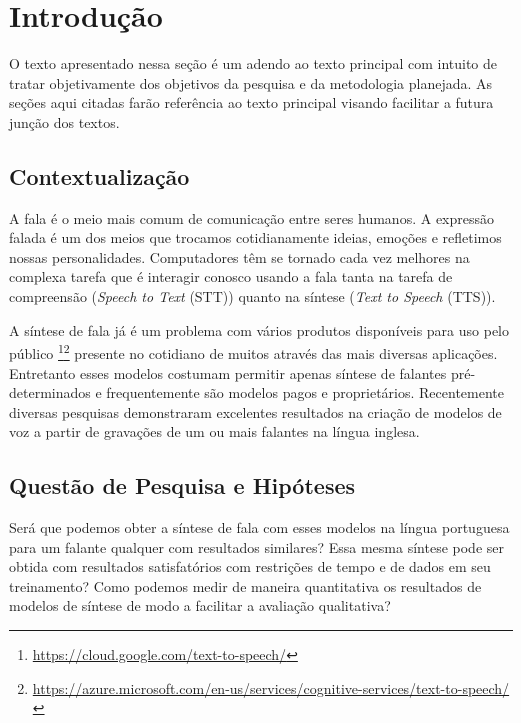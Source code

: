 \documentclass{article}
\begin{document}
\section{Introdução}
O texto apresentado nessa seção é um adendo ao texto principal com intuito de tratar objetivamente dos objetivos da pesquisa e da metodologia planejada. As seções aqui citadas farão referência ao texto principal visando facilitar a futura junção dos textos.
\subsection{Contextualização}
A fala é o meio mais comum de comunicação entre seres humanos\cite{flanang}. 
A expressão falada é um dos meios que trocamos cotidianamente ideias, emoções e refletimos nossas personalidades\cite{Tiwari2012}. 
Computadores têm se tornado cada vez melhores na complexa tarefa que é interagir conosco usando a fala \cite{HCI-voice} tanta na tarefa de compreensão (\emph{Speech to Text} (STT)) quanto na síntese (\emph{Text to Speech} (TTS)). 

A síntese de fala já é um problema com vários produtos disponíveis para uso pelo público \footnote{\url{https://cloud.google.com/text-to-speech/}}\footnote{\url{https://azure.microsoft.com/en-us/services/cognitive-services/text-to-speech/}} presente no cotidiano de muitos através das mais diversas aplicações.
Entretanto esses modelos costumam permitir apenas síntese de falantes pré-determinados e frequentemente são modelos pagos e proprietários. 
Recentemente diversas pesquisas demonstraram excelentes resultados na criação de modelos de voz a partir de gravações de um ou mais falantes na língua inglesa\cite{deepvoice3:DBLP:journals/corr/abs-1710-07654,baidu_voice_clonning:DBLP:journals/corr/abs-1802-06006,facebook:DBLP:journals/corr/TaigmanWPN17,speech_adaptation,wavenet,deepVoice,deepVoice2,deepvoice3:DBLP:journals/corr/abs-1710-07654}.

\subsection{Questão de Pesquisa e Hipóteses}
Será que podemos obter a síntese de fala com esses modelos na língua portuguesa para um falante qualquer com resultados similares?
Essa mesma síntese pode ser obtida com resultados satisfatórios com restrições de tempo e de dados em seu treinamento?
Como podemos medir de maneira quantitativa os resultados de modelos de síntese de modo a facilitar a avaliação qualitativa?
\end{document}
